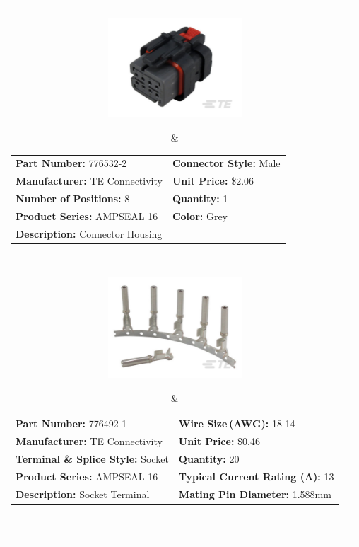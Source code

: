 \documentclass[12pt,letterpaper]{article}
\begin{document}
\begin{longtable}{c l}
\parbox[c]{5cm}{\includegraphics[width=5cm]{776532-2.png} }
& \begin{tabular}{l l}
\textbf{Part Number:} 776532-2 & \textbf{Connector Style:} Male \\
\textbf{Manufacturer:} TE Connectivity & \textbf{Unit Price:} \$2.06 \\
\textbf{Number of Positions:} 8 & \textbf{Quantity:} 1 \\
\textbf{Product Series:} AMPSEAL 16 & \textbf{Color:} Grey \\
\textbf{Description:} Connector Housing & \\
\end{tabular} \\

\parbox[c]{5cm}{\includegraphics[width=5cm]{776492-1.png} }
& \begin{tabular}{l l}
\textbf{Part Number:} 776492-1 & \textbf{Wire Size (AWG):} 18-14 \\
\textbf{Manufacturer:} TE Connectivity & \textbf{Unit Price:} \$0.46 \\
\textbf{Terminal \& Splice Style:} Socket & \textbf{Quantity:} 20 \\
\textbf{Product Series:} AMPSEAL 16 & \textbf{Typical Current Rating (A):} 13 \\
\textbf{Description:} Socket Terminal  & \textbf{Mating Pin Diameter:} 1.588\si{\milli\meter} \\
\end{tabular} \\


\end{longtable}
\end{document}
